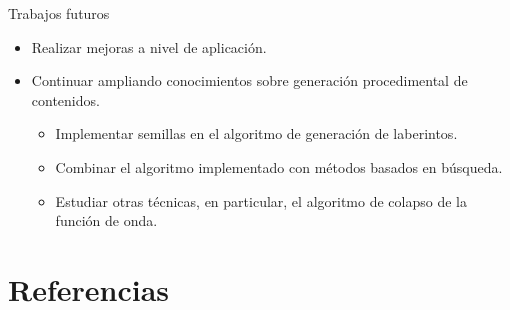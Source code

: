 \documentclass{beamer}
\begin{document}
    \begin{frame}{Trabajos futuros \scriptsize{\hfill \secname}}
    
        \begin{itemize}
            \item Realizar mejoras a nivel de aplicación.
            \item Continuar ampliando conocimientos sobre generación procedimental de contenidos.
            \begin{itemize}
                \item Implementar semillas en el algoritmo de generación de laberintos.
                \item Combinar el algoritmo implementado con métodos basados en búsqueda.
                \item Estudiar otras técnicas, en particular, el algoritmo de colapso de la función de onda.
            \end{itemize}
        \end{itemize}
        
    \end{frame}

\section{Referencias}
\end{document}
